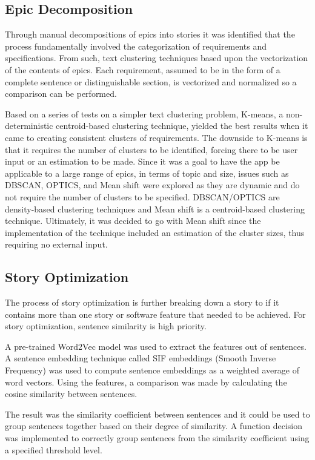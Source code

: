 \subsection{Epic Decomposition}
Through manual decompositions of epics into stories it was identified that the process fundamentally involved the categorization of requirements and specifications. From such, text clustering techniques based upon the vectorization of the contents of epics. Each requirement, assumed to be in the form of a complete sentence or distinguishable section, is vectorized and normalized so a comparison can be performed.

Based on a series of tests on a simpler text clustering problem, K-means, a non-deterministic centroid-based clustering technique, yielded the best results when it came to creating consistent clusters of requirements. The downside to K-means is that it requires the number of clusters to be identified, forcing there to be user input or an estimation to be made. Since it was a goal to have the app be applicable to a large range of epics, in terms of topic and size, issues such as DBSCAN, OPTICS, and Mean shift were explored as they are dynamic and do not require the number of clusters to be specified. DBSCAN/OPTICS are density-based clustering techniques and Mean shift is a centroid-based clustering technique. Ultimately, it was decided to go with Mean shift since the implementation of the technique included an estimation of the cluster sizes, thus requiring no external input.

\subsection{Story Optimization}
The process of story optimization is further breaking down a story to if it contains more than one story or software feature that needed to be achieved. For story optimization, sentence similarity is high priority. 

A pre-trained Word2Vec model was used to extract the features out of sentences. A sentence embedding technique called SIF embeddings (Smooth Inverse Frequency) was used to compute sentence embeddings as a weighted average of word vectors. Using the features, a comparison was made by calculating the cosine similarity between sentences. 

The result was the similarity coefficient between sentences and it could be used to group sentences together based on their degree of similarity. A function decision was implemented to correctly group sentences from the similarity coefficient using a specified threshold level. 

